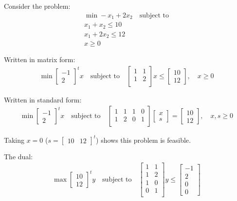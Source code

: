 \documentclass{article}
\begin{document}
\begin{example}
	Consider the problem:
	\begin{align*}
		\min -x_1 + 2x_2 \quad \text{subject to} \\
		x_1 + x_2 \le 10 \\
		x_1 + 2x_2 \le 12 \\
		x \ge 0
	\end{align*}

	Written in matrix form:
	\begin{align*}
		\min \begin{bmatrix} -1 \\ 2 \end{bmatrix}^t x \quad \text{subject to} \quad
		\begin{bmatrix}
			1 & 1 \\
			1 & 2 \\
		\end{bmatrix} x \le \begin{bmatrix} 10 \\ 12 \end{bmatrix}, \quad x \ge 0
	\end{align*}

	Written in standard form:
	\begin{align*}
		\min \begin{bmatrix} -1 \\ 2 \end{bmatrix}^t x \quad \text{subject to} \quad
		\begin{bmatrix}
			1 & 1 & 1 & 0 \\
			1 & 2 & 0 & 1 \\
		\end{bmatrix} \begin{bmatrix} x \\ s \end{bmatrix} = \begin{bmatrix} 10 \\ 12 \end{bmatrix},
		\quad x, s \ge 0
	\end{align*}

	Taking $x = 0$ ($s = \begin{bmatrix} 10 & 12 \end{bmatrix}^t$) shows this problem is feasible.

	The dual:
	\begin{align*}
		\max \begin{bmatrix} 10 \\ 12 \end{bmatrix}^t y \quad \text{subject to} \quad
		\begin{bmatrix}
			1 & 1 \\
			1 & 2 \\
			1 & 0 \\
			0 & 1 \\
		\end{bmatrix} y \le \begin{bmatrix} -1 \\ 2 \\ 0 \\ 0 \end{bmatrix}
	\end{align*}


\end{example}
\end{document}
